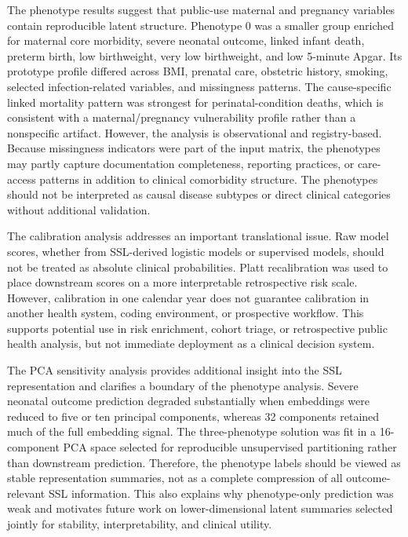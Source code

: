 \documentclass[pdflatex,sn-vancouver-num]{sn-jnl}
\begin{document}
The phenotype results suggest that public-use maternal and pregnancy variables contain reproducible latent structure. Phenotype 0 was a smaller group enriched for maternal core morbidity, severe neonatal outcome, linked infant death, preterm birth, low birthweight, very low birthweight, and low 5-minute Apgar. Its prototype profile differed across BMI, prenatal care, obstetric history, smoking, selected infection-related variables, and missingness patterns. The cause-specific linked mortality pattern was strongest for perinatal-condition deaths, which is consistent with a maternal/pregnancy vulnerability profile rather than a nonspecific artifact. However, the analysis is observational and registry-based. Because missingness indicators were part of the input matrix, the phenotypes may partly capture documentation completeness, reporting practices, or care-access patterns in addition to clinical comorbidity structure. The phenotypes should not be interpreted as causal disease subtypes or direct clinical categories without additional validation.

The calibration analysis addresses an important translational issue. Raw model scores, whether from SSL-derived logistic models or supervised models, should not be treated as absolute clinical probabilities. Platt recalibration was used to place downstream scores on a more interpretable retrospective risk scale. However, calibration in one calendar year does not guarantee calibration in another health system, coding environment, or prospective workflow. This supports potential use in risk enrichment, cohort triage, or retrospective public health analysis, but not immediate deployment as a clinical decision system.

The PCA sensitivity analysis provides additional insight into the SSL representation and clarifies a boundary of the phenotype analysis. Severe neonatal outcome prediction degraded substantially when embeddings were reduced to five or ten principal components, whereas 32 components retained much of the full embedding signal. The three-phenotype solution was fit in a 16-component PCA space selected for reproducible unsupervised partitioning rather than downstream prediction. Therefore, the phenotype labels should be viewed as stable representation summaries, not as a complete compression of all outcome-relevant SSL information. This also explains why phenotype-only prediction was weak and motivates future work on lower-dimensional latent summaries selected jointly for stability, interpretability, and clinical utility.
\end{document}
